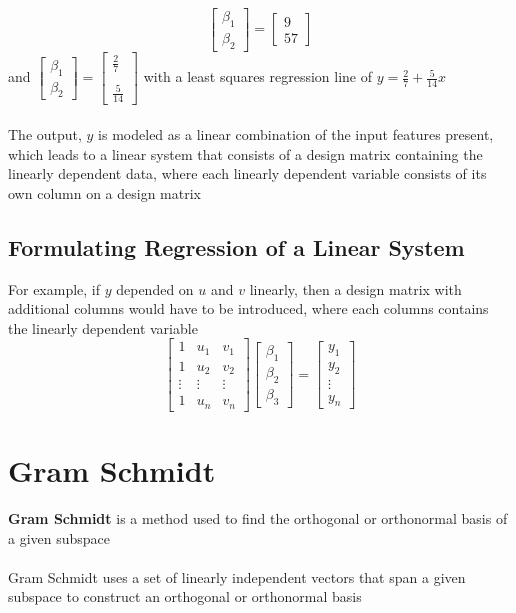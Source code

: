 \begin{enumerate}
\[\begin{bmatrix}
  \beta_1 \\ \beta_2 \end{bmatrix} = \begin{bmatrix} 9 \\ 57 
  \end{bmatrix}
\]
and $\begin{bmatrix} \beta_1 \\ \beta_2 \end{bmatrix} = 
\begin{bmatrix} \frac{2}{7} \\\\ \frac{5}{14} \end{bmatrix}$ 
with a least squares regression line of $y = \frac{2}{7} + 
\frac{5}{14}x$ \\\\
The output, $y$ is modeled as a linear combination of the 
input features present, which leads to a linear system 
that consists of a design matrix containing the linearly dependent 
data, where each linearly dependent variable consists of its own 
column on a design matrix 
\subsection{Formulating Regression of a Linear System}
For example, if $y$ depended on $u$ and $v$ linearly, then a design 
matrix with additional columns would have to be introduced, where 
each columns contains the linearly dependent variable 
\[
  \begin{bmatrix} 1 & u_1 & v_1 \\ 
    1 & u_2 & v_2 \\ \vdots & \vdots & \vdots \\ 
    1 & u_n & v_n \end{bmatrix} \begin{bmatrix} 
  \beta_1 \\ \beta_2 \\ \beta_3 \end{bmatrix} = 
  \begin{bmatrix} y_1 \\ y_2 \\ \vdots \\ y_n \end{bmatrix}
\]
\section{Gram Schmidt}
\textbf{Gram Schmidt} is a method used to find the 
orthogonal or orthonormal basis of a given subspace \\\\
Gram Schmidt uses a set of linearly independent vectors that span 
a given subspace to construct an orthogonal or orthonormal basis

\end{enumerate}
